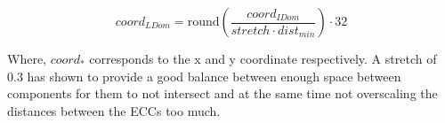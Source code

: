\begin{equation}
    coord_{LDom} = \text{round}\left(\frac{coord_{IDom}}{stretch \cdot dist_{min}}\right) \cdot 32
    \label{eq:ldom_pos}
\end{equation}

Where, $coord_*$ corresponds to the x and y coordinate respectively.
A stretch of $0.3$ has shown to provide a good balance between enough space between components for them to not intersect and at the same time not overscaling the distances between the \acp{ECC} too much.

